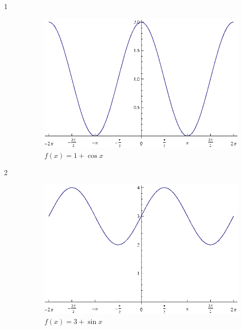 \documentclass{exam}
\begin{document}
    \begin{description}

      \item[1]
        \begin{figure}[H]
          \centering
          \includegraphics[scale=0.8]{exercise01.eps}
          \caption{$f(x) = 1 + \cos x$}
        \end{figure}

      \item[2]
        \begin{figure}[H]
          \centering
          \includegraphics[scale=0.8]{exercise02.eps}
          \caption{$f(x) = 3 + \sin x$}
        \end{figure}


\end{description}
\end{document}
